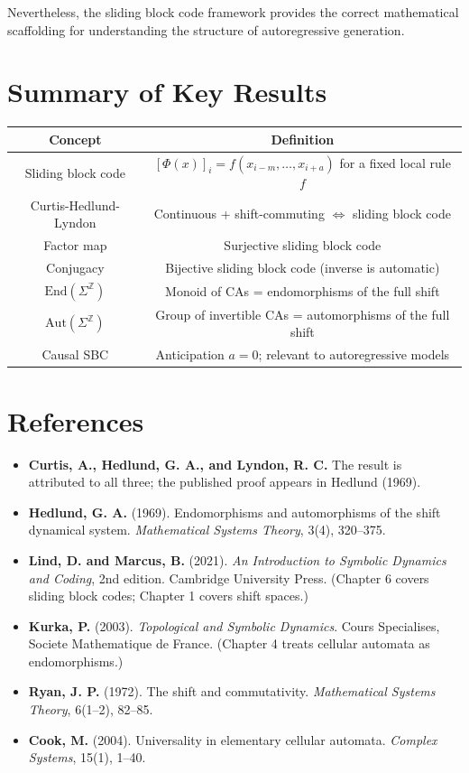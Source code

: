 Nevertheless, the sliding block code framework provides the correct mathematical scaffolding for understanding the structure of autoregressive generation.



\section{Summary of Key Results}

\begin{center}
\begin{tabular}{cc}
\toprule
Concept & Definition \\
\midrule
Sliding block code & $[\Phi(x)]_i = f(x_{i-m}, \ldots, x_{i+a})$ for a fixed local rule $f$ \\
Curtis-Hedlund-Lyndon & Continuous + shift-commuting $\iff$ sliding block code \\
Factor map & Surjective sliding block code \\
Conjugacy & Bijective sliding block code (inverse is automatic) \\
$\text{End}(\Sigma^\mathbb{Z})$ & Monoid of CAs = endomorphisms of the full shift \\
$\text{Aut}(\Sigma^\mathbb{Z})$ & Group of invertible CAs = automorphisms of the full shift \\
Causal SBC & Anticipation $a = 0$; relevant to autoregressive models \\
\bottomrule
\end{tabular}
\end{center}



\section{References}

\begin{itemize}
\item \textbf{Curtis, A., Hedlund, G. A., and Lyndon, R. C.} The result is attributed to all three; the published proof appears in Hedlund (1969).
\item \textbf{Hedlund, G. A.} (1969). Endomorphisms and automorphisms of the shift dynamical system. \textit{Mathematical Systems Theory}, 3(4), 320--375.
\item \textbf{Lind, D. and Marcus, B.} (2021). \textit{An Introduction to Symbolic Dynamics and Coding}, 2nd edition. Cambridge University Press. (Chapter 6 covers sliding block codes; Chapter 1 covers shift spaces.)
\item \textbf{Kurka, P.} (2003). \textit{Topological and Symbolic Dynamics}. Cours Specialises, Societe Mathematique de France. (Chapter 4 treats cellular automata as endomorphisms.)
\item \textbf{Ryan, J. P.} (1972). The shift and commutativity. \textit{Mathematical Systems Theory}, 6(1--2), 82--85.
\item \textbf{Cook, M.} (2004). Universality in elementary cellular automata. \textit{Complex Systems}, 15(1), 1--40.
\end{itemize}



